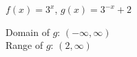 {$f(x) = 3^{x}$, $g(x) = 3^{-x}+2$}
{Domain of $g$:  $(-\infty, \infty)$\\
 Range of $g$:  $(2, \infty)$\\
 

\begin{center}
\end{center}}

